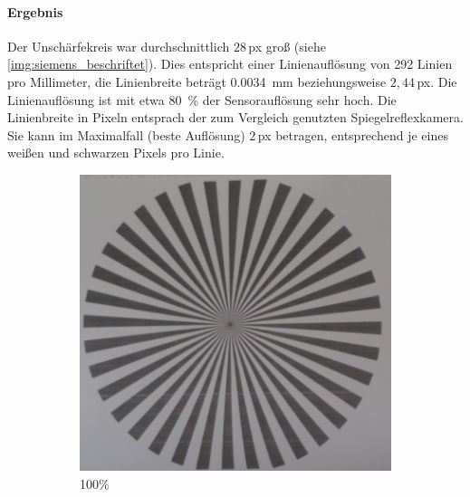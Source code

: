 \documentclass[./00PhotoBox.tex]{subfiles}
\begin{document}
\paragraph{Ergebnis}

Der Unschärfekreis war durchschnittlich $28$\,\gls{px} groß (siehe \autoref{img:siemens_beschriftet}). Dies entspricht einer Linienauflösung von 292 Linien pro Millimeter, die Linienbreite beträgt \SI{0,0034}{\milli\metre} beziehungsweise $2,44$\,\gls{px}. Die Linienauflösung ist mit etwa \SI{80}{\percent} der Sensorauflösung sehr hoch. Die Linienbreite in Pixeln entsprach der zum Vergleich genutzten Spiegelreflexkamera. Sie kann im Maximalfall (beste Auflösung) $2$\,\gls{px} betragen, entsprechend je eines weißen und schwarzen Pixels pro Linie.


\begin{figure}
    \centering
    \begin{subfigure}{0.45\textwidth}
        \includegraphics[height=0.9\linewidth]{./img/4_voruntersuchung/siemens.jpg}
        \centering
        \caption{100\%}
        \label{img:siemens}
    \end{subfigure}
    \begin{subfigure}{0.45\textwidth}

\end{subfigure}
\end{figure}
\end{document}
